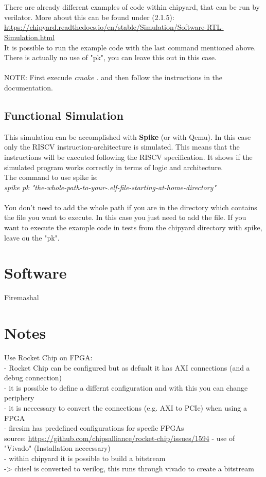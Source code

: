 \documentclass{article}
\begin{document}
{\begin{figure}[h]
\end{figure}
\\\\
There are already different examples of code within chipyard, that can be run by verilator. More about this can be found under (2.1.5):\\
\url{https://chipyard.readthedocs.io/en/stable/Simulation/Software-RTL-Simulation.html}\\
It is possible to run the example code with the last command mentioned above. There is actually no use of "pk", you can leave this out in this case.\\\\
NOTE: First execude \textit{cmake .} and then follow the instructions in the documentation.

\subsection*{Functional Simulation}
This simulation can be accomplished with \textbf{Spike} (or with Qemu). In this case only the 
RISCV instruction-architecture is simulated. This means that the instructions will be executed 
following the RISCV specification. It shows if the simulated program works correctly in terms 
of logic and architecture.\\
The command to use spike is:\\
\textit{spike pk "the-whole-path-to-your-.elf-file-starting-at-home-directory"}\\\\
You don't need to add the whole path if you are in the directory which contains the file you want to execute. In this case you just need to add the file.
If you want to execute the example code in tests from the chipyard directory with spike, leave ou the "pk".

\section*{Software}
Firemashal

\section*{Notes}
Use Rocket Chip on FPGA:\\
- Rocket Chip can be configured but as defualt it has AXI connections (and a debug connection)\\
- it is possible to define a differnt configuration and with this you can change periphery\\
- it is neccessary to convert the connections (e.g. AXI to PCIe) when using a FPGA\\
- firesim has predefined configurations for specfic FPGAs\\
source: \url{https://github.com/chipsalliance/rocket-chip/issues/1594}
- use of "Vivado" (Installation neccessary)\\
- within chipyard it is possible to build a bitstream\\
-> chisel is converted to verilog, this runs through vivado to create a bitstream 

}
\end{document}
